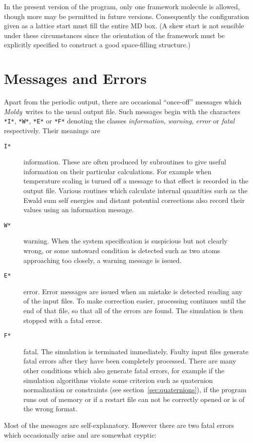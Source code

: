 \documentclass[twoside]{report}
\newcommand{\moldy}{{\em Moldy}}
\begin{document}
In the present version of the program, only one framework molecule is
allowed, though more may be permitted in future versions. Consequently
the configuration given as a lattice start must fill the entire MD
box. (A skew start is not sensible under these circumstances since the
orientation of the framework must be explicitly specified to construct
a good space-filling structure.)

\section{Messages and Errors}%

Apart from the periodic output, there are occasional ``once-off''
messages which \moldy\  writes to the usual output file.  Such messages
begin with the characters \texttt{*I*}, \texttt{*W*}, \texttt{*E*} or
\texttt{*F*} denoting the classes {\em information}, {\em warning}, {\em
error\/} or {\em fatal\/} respectively.  Their meanings are
\begin{description}
\item[{\tt*I*}] information. These are often produced by subroutines
to give useful information on their particular calculations.  For
example when temperature scaling is turned off a message to that
effect is recorded in the output file.  Various routines which
calculate internal quantities such as the Ewald sum self energies and
distant potential corrections also record their values using an
information message.
\item[{\tt*W*}] warning.  When the system specification is suspicious
but not clearly wrong, or some untoward condition is detected such as
two atoms approaching too closely, a warning message is issued.
\item[{\tt*E*}] error. Error messages are issued when an mistake is
detected reading any of the input files. To make correction easier,
processing continues until the end of that file, so that all of the
errors are found.  The simulation is then stopped with a fatal error.
\item[{\tt*F*}] fatal. The simulation is terminated immediately. Faulty 
input files generate fatal errors after they have been completely
processed.  There are many other conditions which also generate fatal
errors, for example if the simulation algorithms violate some
criterion such as quaternion normalization or constraints (see
section~\ref{sec:quaternions}), if the program runs out of memory or
if a restart file can not be correctly opened or is of the wrong
format.
\end{description}
Most of the messages are self-explanatory.  However there are two
fatal errors which occasionally arise and are somewhat cryptic:
\end{document}
